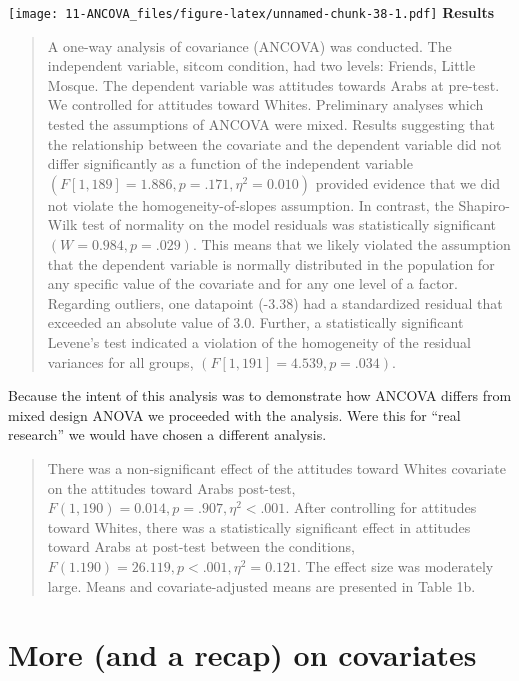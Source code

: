 \documentclass[
  11pt,
]{book}
\begin{document}
\texttt{[image: 11-ANCOVA\_files/figure-latex/unnamed-chunk-38-1.pdf]} \textbf{Results}

\begin{quote}
A one-way analysis of covariance (ANCOVA) was conducted. The independent variable, sitcom condition, had two levels: Friends, Little Mosque. The dependent variable was attitudes towards Arabs at pre-test. We controlled for attitudes toward Whites. Preliminary analyses which tested the assumptions of ANCOVA were mixed. Results suggesting that the relationship between the covariate and the dependent variable did not differ significantly as a function of the independent variable \((F [1, 189] = 1.886, p = .171, \eta^2 = 0.010)\) provided evidence that we did not violate the homogeneity-of-slopes assumption. In contrast, the Shapiro-Wilk test of normality on the model residuals was statistically significant \((W = 0.984, p = .029)\). This means that we likely violated the assumption that the dependent variable is normally distributed in the population for any specific value of the covariate and for any one level of a factor. Regarding outliers, one datapoint (-3.38) had a standardized residual that exceeded an absolute value of 3.0. Further, a statistically significant Levene's test indicated a violation of the homogeneity of the residual variances for all groups, \((F[1, 191] = 4.539, p = .034)\).
\end{quote}

Because the intent of this analysis was to demonstrate how ANCOVA differs from mixed design ANOVA we proceeded with the analysis. Were this for ``real research'' we would have chosen a different analysis.

\begin{quote}
There was a non-significant effect of the attitudes toward Whites covariate on the attitudes toward Arabs post-test, \(F (1,190) = 0.014, p = .907, \eta^2 < .001\). After controlling for attitudes toward Whites, there was a statistically significant effect in attitudes toward Arabs at post-test between the conditions, \(F(1. 190) = 26.119, p < .001, \eta^2 = 0.121\). The effect size was moderately large. Means and covariate-adjusted means are presented in Table 1b.
\end{quote}

\hypertarget{more-and-a-recap-on-covariates}{%
\section{More (and a recap) on covariates}\label{more-and-a-recap-on-covariates}}
\end{document}
